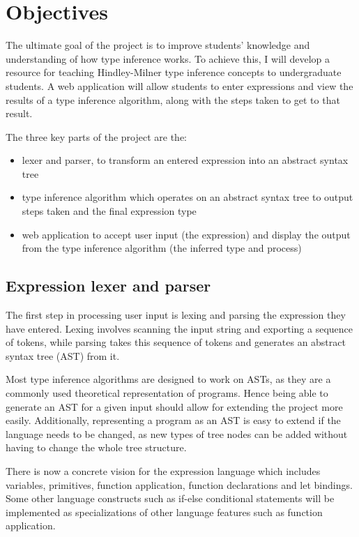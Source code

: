 \documentclass[a4paper,fleqn,12pt]{article}
\begin{document}
\section{Objectives}\label{id:h.gzv15kg5v14e}

The ultimate goal of the project is to improve students’ knowledge and understanding of how type inference works. To achieve this, I will develop a resource for teaching Hindley-Milner type inference concepts to undergraduate students. A web application will allow students to enter expressions and view the results of a type inference algorithm, along with the steps taken to get to that result.

The three key parts of the project are the:

\begin{itemize}
  \item lexer and parser, to transform an entered expression into an abstract syntax tree
  \item type inference algorithm which operates on an abstract syntax tree to output steps taken and the final expression type
  \item web application to accept user input (the expression) and display the output from the type inference algorithm (the inferred type and process)
\end{itemize}

\subsection{Expression lexer and parser}\label{id:h.v6vafhv28y3i}

The first step in processing user input is lexing and parsing the expression they have entered. Lexing involves scanning the input string and exporting a sequence of tokens, while parsing takes this sequence of tokens and generates an abstract syntax tree (AST) from it.

Most type inference algorithms are designed to work on ASTs, as they are a commonly used theoretical representation of programs. Hence being able to generate an AST for a given input should allow for extending the project more easily. Additionally, representing a program as an AST is easy to extend if the language needs to be changed, as new types of tree nodes can be added without having to change the whole tree structure.

There is now a concrete vision for the expression language which includes variables, primitives, function application, function declarations and let bindings. Some other language constructs such as if-else conditional statements will be implemented as specializations of other language features such as function application.
\end{document}
